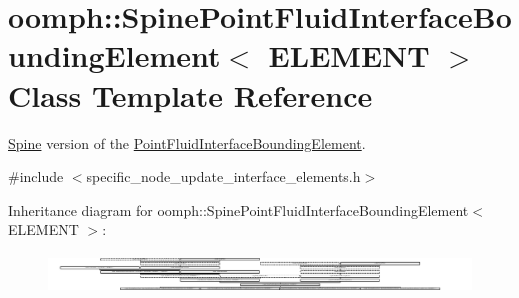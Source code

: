 \hypertarget{classoomph_1_1SpinePointFluidInterfaceBoundingElement}{}\section{oomph\+:\+:Spine\+Point\+Fluid\+Interface\+Bounding\+Element$<$ E\+L\+E\+M\+E\+NT $>$ Class Template Reference}
\label{classoomph_1_1SpinePointFluidInterfaceBoundingElement}


\hyperlink{classoomph_1_1Spine}{Spine} version of the \hyperlink{classoomph_1_1PointFluidInterfaceBoundingElement}{Point\+Fluid\+Interface\+Bounding\+Element}.  




{\ttfamily \#include $<$specific\+\_\+node\+\_\+update\+\_\+interface\+\_\+elements.\+h$>$}

Inheritance diagram for oomph\+:\+:Spine\+Point\+Fluid\+Interface\+Bounding\+Element$<$ E\+L\+E\+M\+E\+NT $>$\+:\begin{figure}[H]
\begin{center}
\leavevmode
\includegraphics[height=1.055359cm]{classoomph_1_1SpinePointFluidInterfaceBoundingElement}
\end{center}
\end{figure}
